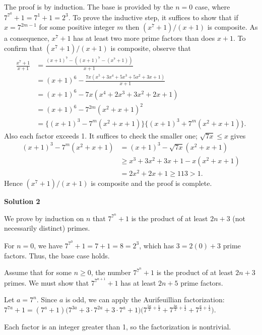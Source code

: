 \begin{enumerate}
The proof is by induction. The base is provided by the $n = 0$ case, where $7^{7^0} + 1 = 7^1 + 1 = 2^3$. To prove the inductive step, it suffices to show that if $x = 7^{2m - 1}$ for some positive integer $m$ then $(x^7 + 1)/(x + 1)$ is composite. As a consequence, $x^7 + 1$ has at least two more prime factors than does $x + 1$. To confirm that $(x^7 + 1)/(x + 1)$ is composite, observe that
 \begin{align*} \frac{x^7 + 1}{x + 1} &= \frac{(x + 1)^7 - ((x + 1)^7 - (x^7 + 1))}{x + 1} \\ &= (x + 1)^6 - \frac{7x(x^5 + 3x^4 + 5x^3 + 5x^2 + 3x + 1)}{x + 1} \\ &= (x + 1)^6 - 7x(x^4 + 2x^3 + 3x^2 + 2x + 1) \\ &= (x + 1)^6 - 7^{2m}(x^2 + x + 1)^2 \\ &= \{(x + 1)^3 - 7^m(x^2 + x + 1)\}\{(x + 1)^3 + 7^m(x^2 + x + 1)\}. \end{align*}
Also each factor exceeds 1. It suffices to check the smaller one; $\sqrt{7x}\leq x$ gives
 \begin{align*} (x + 1)^3 - 7^m(x^2 + x + 1) &= (x + 1)^3 - \sqrt{7x}(x^2 + x + 1) \\ &\geq x^3 + 3x^2 + 3x + 1 - x(x^2 + x + 1) \\ &= 2x^2 + 2x + 1\geq 113 > 1. \end{align*}
Hence $(x^7 + 1)/(x + 1)$ is composite and the proof is complete.

 



\textbf{Solution 2}

We prove by induction on $n$ that $7^{7^n} + 1$ is the product of at least $2n + 3$ (not necessarily distinct) primes.

 For $n = 0$, we have $7^{7^0} + 1 = 7 + 1 = 8 = 2^3$, which has $3 = 2(0) + 3$ prime factors.  Thus, the base case holds.

 Assume that for some $n \ge 0$, the number $7^{7^n} + 1$ is the product of at least $2n + 3$ primes.  We must show that $7^{7^{n+1}} + 1$ has at least $2n + 5$ prime factors.

 Let $a = 7^n$. Since $a$ is odd, we can apply the Aurifeuillian factorization:$7^{7a} + 1 = (7^a + 1)\big(7^{3a} + 3\cdot7^{2a} + 3\cdot7^a + 1\big)\big(7^{\frac{5a}{2} + \frac{1}{2}} + 7^{\frac{3a}{2} + \frac{1}{2}} + 7^{\frac{a}{2} + \frac{1}{2}}\big)$.

 Each factor is an integer greater than 1, so the factorization is nontrivial.


\end{enumerate}
